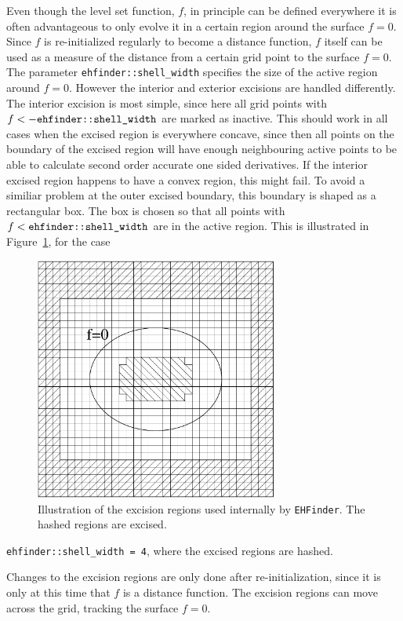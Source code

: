 Even though the level set function, $f$, in principle can be defined
everywhere it is often advantageous to only evolve it in a certain region
around the surface $f=0$. Since $f$ is re-initialized regularly to become
a distance function, $f$ itself can be used as a measure of the distance
from a certain grid point to the surface $f=0$. The parameter
{\tt ehfinder::shell\_width} specifies the size of the active region
around $f=0$. However the interior and exterior excisions are handled
differently. The interior excision is most simple, since here all grid points
with $f<-{\mbox{\tt ehfinder::shell\_width}}$ are marked as inactive. This
should work in all cases when the excised region is everywhere concave, since
then all points on the boundary of the excised region will have enough
neighbouring active points to be able to calculate second order accurate one
sided derivatives. If the interior excised region happens to have a convex
region, this might fail. To avoid a similiar problem at the outer excised
boundary, this boundary is shaped as a rectangular box. The box is chosen
so that all points with $f<{\mbox{\tt ehfinder::shell\_width}}$ are in the
active region. This is illustrated in
Figure~\ref{AEIThorns_EHFinder_excisefig}, for the case
\begin{figure}[ht]
  \begin{center}
    \includegraphics[width=8cm]{excision}
  \end{center}
  \caption{Illustration of the excision regions used internally by
           {\tt EHFinder}. The hashed regions are excised.}
  \label{AEIThorns_EHFinder_excisefig}
\end{figure}
{\tt ehfinder::shell\_width = 4}, where the excised regions are hashed.

Changes to the excision regions are only done after re-initialization,
since it is only at this time that $f$ is a distance function. The excision
regions can move across the grid, tracking the surface $f=0$.

